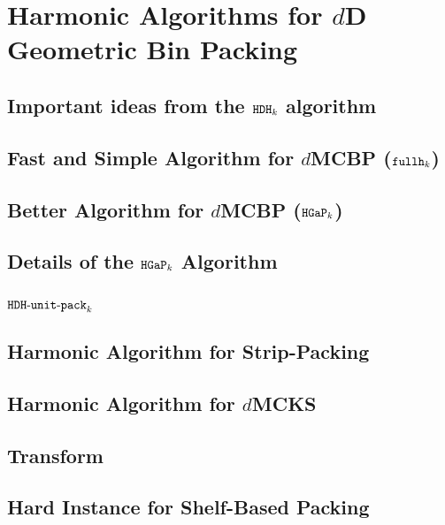 \chapter{Harmonic Algorithms for \texorpdfstring{$d$}{d}D Geometric Bin Packing}
\label{chap:hdhk}



\section{Important ideas from the \texorpdfstring{$\operatorname{\mathtt{HDH}}_{k}$}{HDH} algorithm}
\label{sec:hdhk-prelims}
\label{sec:hdhk-prelims:hdhkunit}

\section{Fast and Simple Algorithm for \texorpdfstring{$d$}{d}MCBP
(\texorpdfstring{$\operatorname{\mathtt{fullh}}_k$}{fullh\_k})}
\label{sec:fhk}

\section{Better Algorithm for \texorpdfstring{$d$}{d}MCBP
(\texorpdfstring{$\operatorname{\mathtt{HGaP}}_k$}{HGaP\_k})}
\label{sec:hgap}

\section{Details of the \texorpdfstring{$\operatorname{\mathtt{HGaP}}_k$}{HGaP} Algorithm}
\label{sec:hgap-extra}

\section{\texorpdfstring{$\operatorname{\mathtt{HDH-unit-pack}}_k$}{HDH-unit-pack}}
\label{sec:hdhkunit}

\section{Harmonic Algorithm for Strip-Packing}
\label{sec:hdhk-sp}

\section{Harmonic Algorithm for \texorpdfstring{$d$}{d}MCKS}
\label{sec:hdhks}

\section{\DFF{} Transform}
\label{sec:dff-trn}

\begin{optional}
\section{Hard Instance for Shelf-Based Packing}
\label{sec:hard-example}
\end{optional}
